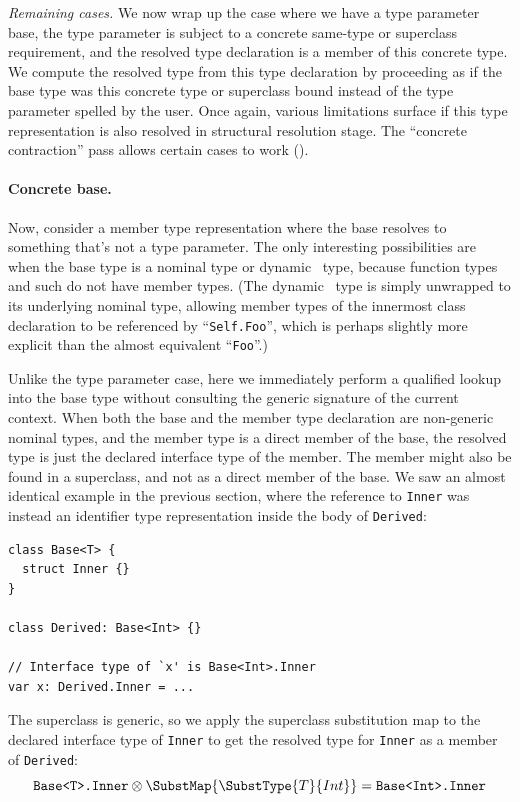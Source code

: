 \documentclass[../generics]{subfiles}
\begin{document}
\smallskip

\emph{Remaining cases.} We now wrap up the case where we have a type parameter base, the type parameter is subject to a concrete same-type or superclass requirement, and the resolved type declaration is a member of this concrete type. We compute the resolved type from this type declaration by proceeding as if the base type was this concrete type or superclass bound instead of the type parameter spelled by the user. Once again, various limitations surface if this type representation is also resolved in structural resolution stage. The ``concrete contraction'' pass allows certain cases to work ().

\paragraph{Concrete base.} Now, consider a member type representation where the base resolves to something that's not a type parameter. The only interesting possibilities are when the base type is a nominal type or dynamic \tSelf\ type, because function types and such do not have member types. (The dynamic \tSelf\ type is simply unwrapped to its underlying nominal type, allowing member types of the innermost class declaration to be referenced by ``\texttt{Self.Foo}'', which is perhaps slightly more explicit than the almost equivalent ``\texttt{Foo}''.)

Unlike the type parameter case, here we immediately perform a qualified lookup into the base type without consulting the generic signature of the current context. When both the base and the member type declaration are non-generic nominal types, and the member type is a direct member of the base, the resolved type is just the declared interface type of the member. The member might also be found in a superclass, and not as a direct member of the base. We saw an almost identical example in the previous section, where the reference to \texttt{Inner} was instead an identifier type representation inside the body of \texttt{Derived}:
\begin{Verbatim}
class Base<T> {
  struct Inner {}
}

class Derived: Base<Int> {}

// Interface type of `x' is Base<Int>.Inner
var x: Derived.Inner = ...
\end{Verbatim}
The superclass is generic, so we apply the superclass substitution map to the declared interface type of \texttt{Inner} to get the resolved type for \texttt{Inner} as a member of \texttt{Derived}:
\[\texttt{Base<T>.Inner}\otimes\SubstMap{\SubstType{T}{Int}}=\texttt{Base<Int>.Inner}\]
\end{document}
